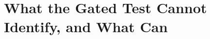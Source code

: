 \documentclass{article}
\begin{document}
\section{What the Gated Test Cannot Identify, and What Can}
\label{sec:testability}
\end{document}
